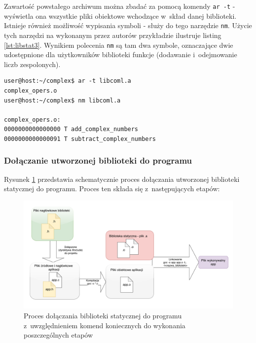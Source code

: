 Zawartość powstałego archiwum można zbadać za pomocą komendy \lstinline[language=Cmd]{ar -t} - wyświetla ona wszystkie pliki obiektowe wchodzące w~skład danej biblioteki. Istnieje również możliwość wypisania symboli - służy do tego narzędzie \lstinline[language=Cmd]{nm}. Użycie tych narzędzi na wykonanym przez autorów przykładzie ilustruje listing \ref{lst:libstat3}. Wynikiem polecenia \lstinline[language=Cmd]{nm} są tam dwa symbole, oznaczające dwie udostępnione dla użytkowników biblioteki funkcje (dodawanie i~odejmowanie liczb zespolonych).

\begin{lstlisting}[language=Cmd, caption={Użycie poleceń \lstinline{ar -t} oraz \lstinline{nm} na bibliotece statycznej.},label={lst:libstat3}]
user@host:~/complex$ ar -t libcoml.a
complex_opers.o
user@host:~/complex$ nm libcoml.a

complex_opers.o:
0000000000000000 T add_complex_numbers
0000000000000091 T subtract_complex_numbers
\end{lstlisting}

\newpage
\subsubsection*{Dołączanie utworzonej biblioteki do programu}
Rysunek \ref{fig:staticliblink} przedstawia schematycznie proces dołączania utworzonej biblioteki statycznej do programu. Proces ten składa się z~następujących etapów:

\begin{figure}[H]
\centering
\includegraphics[width=\textwidth]{res/StaticLibLink}
\caption{Proces dołączania biblioteki statycznej do programu z~uwzględnieniem komend koniecznych do wykonania poszczególnych etapów \cite{Compiling}}
\label{fig:staticliblink}
\end{figure}

